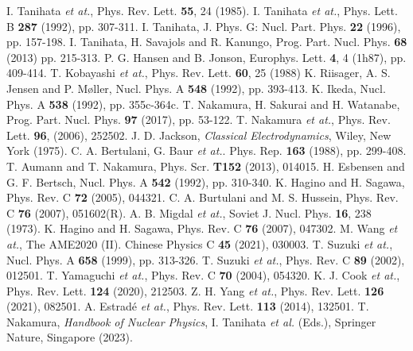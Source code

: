 \begin{thebibliography}{999}
I. Tanihata \textit{et at.}, Phys. Rev. Lett. \textbf{55}, 24 (1985).
I. Tanihata \textit{et at.}, Phys. Lett. B \textbf{287} (1992), pp. 307-311.
I. Tanihata, J. Phys. G: Nucl. Part. Phys. \textbf{22} (1996), pp. 157-198.
I. Tanihata, H. Savajols and R. Kanungo, Prog. Part. Nucl. Phys. \textbf{68} (2013) pp. 215-313.
P. G. Hansen and B. Jonson, Europhys. Lett. \textbf{4}, 4 (1h87), pp. 409-414.
T. Kobayashi \textit{et at.}, Phys. Rev. Lett. \textbf{60}, 25 (1988)
K. Riisager, A. S. Jensen and P. Møller, Nucl. Phys. A \textbf{548} (1992), pp. 393-413.
K. Ikeda, Nucl. Phys. A \textbf{538} (1992), pp. 355c-364c.
T. Nakamura, H. Sakurai and H. Watanabe, Prog. Part. Nucl. Phys. \textbf{97} (2017), pp. 53-122.
T. Nakamura \textit{et at.}, Phys. Rev. Lett. \textbf{96}, (2006), 252502.
J. D. Jackson, \textit{Classical Electrodynamics}, Wiley, New York (1975).
C. A. Bertulani, G. Baur \textit{et at.}. Phys. Rep. \textbf{163} (1988), pp. 299-408.
T. Aumann and T. Nakamura, Phys. Scr. \textbf{T152} (2013), 014015.
H. Esbensen and G. F. Bertsch, Nucl. Phys. A \textbf{542} (1992), pp. 310-340.
K. Hagino and H. Sagawa, Phys. Rev. C \textbf{72} (2005), 044321.
C. A. Burtulani and M. S. Hussein, Phys. Rev. C \textbf{76} (2007), 051602(R).
A. B. Migdal \textit{et at.}, Soviet J. Nucl. Phys. \textbf{16}, 238 (1973).
K. Hagino and H. Sagawa, Phys. Rev. C \textbf{76} (2007), 047302.
M. Wang \textit{et at.}, The AME2020 (II). Chinese Physics C \textbf{45} (2021), 030003.
T. Suzuki \textit{et at.}, Nucl. Phys. A \textbf{658} (1999), pp. 313-326.
T. Suzuki \textit{et at.}, Phys. Rev. C \textbf{89} (2002), 012501.
T. Yamaguchi \textit{et at.}, Phys. Rev. C \textbf{70} (2004), 054320.
K. J. Cook \textit{et at.}, Phys. Rev. Lett. \textbf{124} (2020), 212503.
Z. H. Yang \textit{et at.}, Phys. Rev. Lett. \textbf{126} (2021), 082501. 
A. Estradé \textit{et at.}, Phys. Rev. Lett. \textbf{113} (2014), 132501.
T. Nakamura, \textit{Handbook of Nuclear Physics}, I. Tanihata \textit{et al.} (Eds.), Springer Nature, Singapore (2023).

\end{thebibliography}
